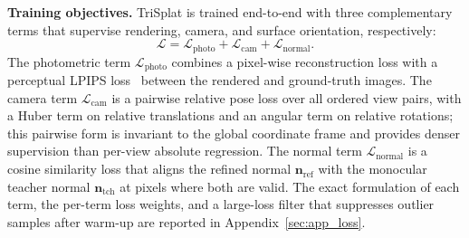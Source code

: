 \documentclass{llmxive}
\providecommand{\method}{TriSplat\xspace}
\providecommand{\boldstart}[1]{\vspace{0.1in}\noindent\textbf{#1}}
\begin{document}
\boldstart{Training objectives.}
\method is trained end-to-end with three complementary terms that supervise rendering, camera, and surface orientation, respectively:
\begin{equation}
    \mathcal{L} = \mathcal{L}_{\mathrm{photo}} + \mathcal{L}_{\mathrm{cam}} + \mathcal{L}_{\mathrm{normal}}.
    \label{eq:total}
\end{equation}
The photometric term $\mathcal{L}_{\mathrm{photo}}$ combines a pixel-wise reconstruction loss with a perceptual LPIPS loss~\citep{zhang2018unreasonable} between the rendered and ground-truth images. The camera term $\mathcal{L}_{\mathrm{cam}}$ is a pairwise relative pose loss over all ordered view pairs, with a Huber term on relative translations and an angular term on relative rotations; this pairwise form is invariant to the global coordinate frame and provides denser supervision than per-view absolute regression. The normal term $\mathcal{L}_{\mathrm{normal}}$ is a cosine similarity loss that aligns the refined normal $\mathbf{n}_{\mathrm{ref}}$ with the monocular teacher normal $\mathbf{n}_{\mathrm{tch}}$ at pixels where both are valid. The exact formulation of each term, the per-term loss weights, and a large-loss filter that suppresses outlier samples after warm-up are reported in Appendix~\ref{sec:app_loss}.
\end{document}
